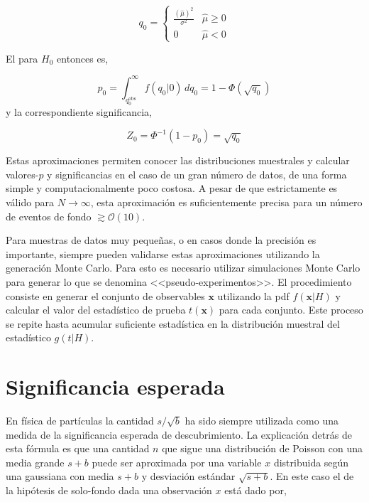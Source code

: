 \begin{equation}
  q_0 =
  \begin{cases}
    \frac{(\hat{\mu})^2}{\sigma^2} & \hat{\mu} \geq 0 \\
    0 & \hat{\mu} < 0
  \end{cases}
\end{equation}

El {\pvalue} para $H_0$ entonces es,

\begin{equation}
  p_0 = \int_{q_{0}^{\text{obs}}}^{\infty} f(q_0|0) \, dq_0 = 1 - \Phi(\sqrt{q_0})
\end{equation}
%
y la correspondiente significancia,

\begin{equation}
  Z_0 = \Phi^{-1} (1-p_0) = \sqrt{q_0}
\end{equation}

Estas aproximaciones permiten conocer las distribuciones muestrales y calcular
valores-$p$ y significancias en el caso de un gran número de datos, de una forma
simple y computacionalmente poco costosa. A pesar de que estrictamente es válido
para $N\to\infty$, esta aproximación es suficientemente precisa para un número
de eventos de fondo $\gtrsim \mathcal{O}(10)$.

Para muestras de datos muy pequeñas, o en casos donde la precisión es
importante, siempre pueden validarse estas aproximaciones utilizando la
generación Monte Carlo.
Para esto es necesario utilizar simulaciones Monte Carlo para generar lo que se
denomina <<pseudo-experimentos>>. El procedimiento consiste en generar el
conjunto de observables $\bm{x}$ utilizando la pdf $f(\bm{x}|H)$ y calcular el
valor del estadístico de prueba $t(\bm{x})$ para cada conjunto. Este proceso se
repite hasta acumular suficiente estadística en la distribución muestral del
estadístico $g(t|H)$.



\section{Significancia esperada}

En física de partículas la cantidad $s/\sqrt{b}$ ha sido siempre utilizada como
una medida de la significancia esperada de descubrimiento\cite{medsigNote}. La
explicación detrás de esta fórmula es que una cantidad $n$ que sigue una
distribución de Poisson con una media grande $s+b$ puede ser aproximada por una
variable $x$ distribuida según una gaussiana con media $s+b$ y desviación
estándar $\sqrt{s+b}$. En este caso el {\pvalue} de la hipótesis de solo-fondo
dada una observación $x$ está dado por,

